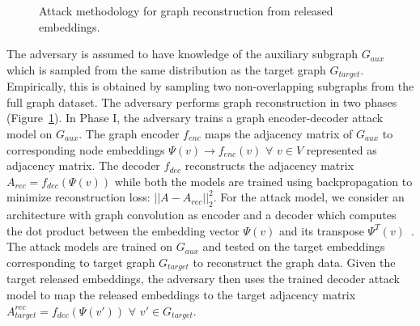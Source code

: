 \begin{figure}[!htb]
    \centering
    \begin{minipage}[b]{1\linewidth}
    \centering


    \end{minipage}
    \caption{Attack methodology for graph reconstruction from released embeddings.}
    \label{fig:recattack}
\end{figure}


The adversary is assumed to have knowledge of the auxiliary subgraph $G_{aux}$ which is sampled from the same distribution as the target graph $G_{target}$.
Empirically, this is obtained by sampling two non-overlapping subgraphs from the full graph dataset.
The adversary performs graph reconstruction in two phases (Figure~\ref{fig:recattack}).
In Phase I, the adversary trains a graph encoder-decoder attack model on $G_{aux}$.
The graph encoder $f_{enc}$ maps the adjacency matrix of $G_{aux}$ to corresponding node embeddings $\Psi (v)\rightarrow f_{enc}(v)$ $\forall$ $v \in V$ represented as adjacency matrix.
The decoder $f_{dec}$ reconstructs the adjacency matrix $A_{rec} = f_{dec}(\Psi (v))$ while both the models are trained using backpropagation to minimize reconstruction loss: $||A - A_{rec}||_2^2$.
For the attack model, we consider an architecture with graph convolution as encoder and a decoder which computes the dot product between the embedding vector $\Psi (v)$ and its transpose $\Psi^T (v)$~\cite{Kipf2016tc}.
The attack models are trained on $G_{aux}$ and tested on the target embeddings corresponding to target graph $G_{target}$ to reconstruct the graph data.
Given the target released embeddings, the adversary then uses the trained decoder attack model to map the released embeddings to the target adjacency matrix $A_{target}^{rec} = f_{dec}(\Psi (v'))$ $\forall$ $v'\in G_{target}$.\\


